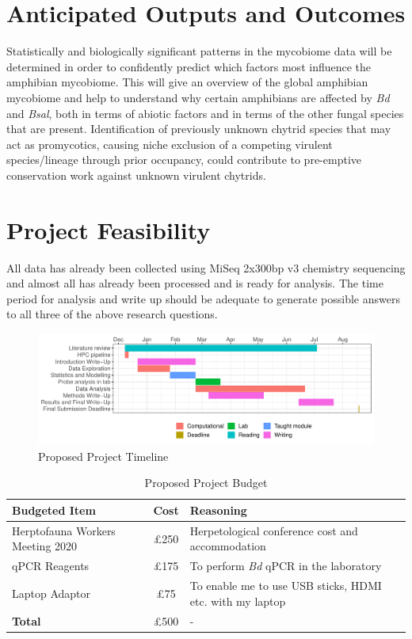 \documentclass[11pt, a4paper, titlepage]{article}
\begin{document}
\section{Anticipated Outputs and Outcomes}

Statistically and biologically significant patterns in the mycobiome data will be determined in order to confidently predict which factors most influence the amphibian mycobiome. This will give an overview of the global amphibian mycobiome and help to understand why certain amphibians are affected by \textit{Bd} and \textit{Bsal}, both in terms of abiotic factors and in terms of the other fungal species that are present. Identification of previously unknown chytrid species that may act as promycotics, causing niche exclusion of a competing virulent species/lineage through prior occupancy, could contribute to pre-emptive conservation work against unknown virulent chytrids.

\section{Project Feasibility}

All data has already been collected using MiSeq 2x300bp v3 chemistry sequencing and almost all has already been processed and is ready for analysis. The time period for analysis and write up should be adequate to generate possible answers to all three of the above research questions. 

\begin{figure}[h!]
	\centering\includegraphics[width=1\textwidth]{GanttChart.pdf}
	\caption{Proposed Project Timeline}
\end{figure}

\begin{table}[h!]
	\small
	\begin{tabular} {| l | c | l |}  \hline
		\textbf{Budgeted Item} & \textbf{Cost} & \textbf{Reasoning} \\ \hline
		Herptofauna Workers Meeting 2020 & £250 & Herpetological conference cost and accommodation \\ \hline
		qPCR Reagents & £175 & To perform \textit{Bd} qPCR in the laboratory \\ \hline
		Laptop Adaptor & £75 & To enable me to use USB sticks, HDMI etc. with my laptop \\ \hline
		\textbf{Total} & £500  & - \\ \hline
	\end{tabular}
	\caption{Proposed Project Budget}
\end{table}
\end{document}
